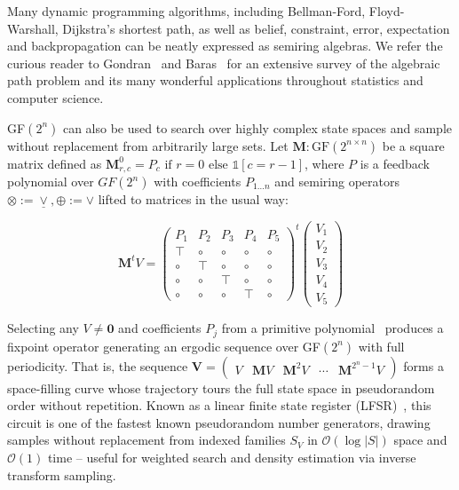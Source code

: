 \documentclass[sigplan,10pt,review,anonymous]{acmart}
\begin{document}
\noindent Many dynamic programming algorithms, including Bellman-Ford, Floyd-Warshall, Dijkstra's shortest path, as well as belief, constraint, error, expectation and backpropagation can be neatly expressed as semiring algebras. We refer the curious reader to Gondran~\citep{gondran2008graphs} and Baras~\citep{baras2010path} for an extensive survey of the algebraic path problem and its many wonderful applications throughout statistics and computer science.

GF$(2^n)$ can also be used to search over highly complex state spaces and sample without replacement from arbitrarily large sets. Let $\textbf{M}: \text{GF}(2^{n\times n})$ be a square matrix defined as $\mathbf{M}^0_{r, c} = P_c \text{ if } r=0 \text{ else } \mathds{1}[c = r - 1]$, where $P$ is a feedback polynomial over $GF(2^n)$ with coefficients $P_{1\ldots n}$ and semiring operators $\otimes := \underline{\vee}, \oplus := \vee$ lifted to matrices in the usual way:

\vspace{-7}
\[
\mathbf{M}^tV = \begin{pmatrix}
  P_1 & P_2 & P_3 & P_4 & P_5 \\
  \top & \circ & \circ & \circ & \circ \\
  \circ & \top & \circ & \circ & \circ \\
  \circ & \circ & \top & \circ & \circ \\
  \circ & \circ & \circ & \top & \circ
\end{pmatrix}^t
\begin{pmatrix}
      V_1 \\
      V_2 \\
      V_3 \\
      V_4 \\
      V_5
\end{pmatrix}
\]

Selecting any $V \neq \mathbf{0}$ and coefficients $P_j$ from a primitive polynomial~\citep{saxena2004primitive} produces a fixpoint operator generating an ergodic sequence over GF$(2^n)$ with full periodicity. That is, the sequence $\mathbf{V} = \begin{pmatrix}V & \mathbf{M}V & \mathbf{M}^{2}V & \cdots & \mathbf{M}^{2^n-1}V \end{pmatrix}$ forms a space-filling curve whose trajectory tours the full state space in pseudorandom order without repetition. Known as a linear finite state register (LFSR)~\citep{klein2013linear}, this circuit is one of the fastest known pseudorandom number generators, drawing samples without replacement from indexed families $S_V$ in $\mathcal{O}(\log |S|)$ space and $\mathcal{O}(1)$ time -- useful for weighted search and density estimation via inverse transform sampling.
\end{document}
